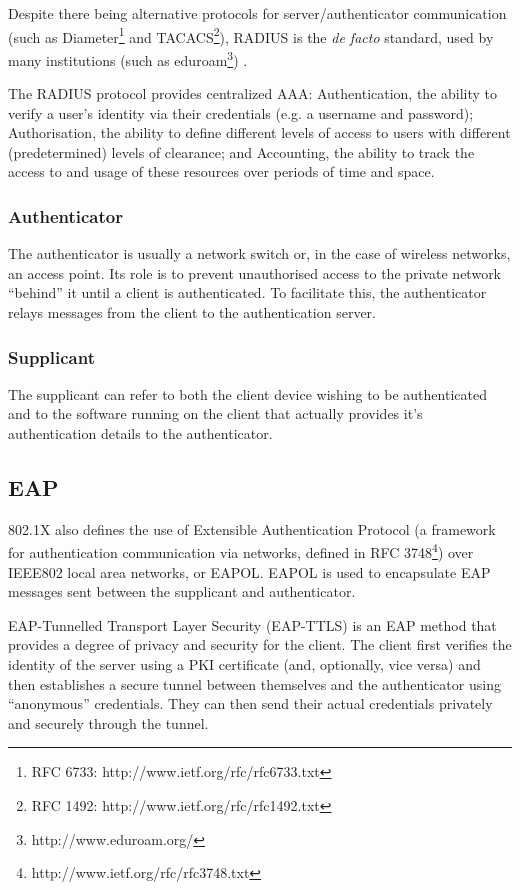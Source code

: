 \documentclass[12pt,a4paper,titlepage]{article}
\begin{document}
Despite there being alternative protocols for server/authenticator communication (such as Diameter\footnote{RFC 6733: http://www.ietf.org/rfc/rfc6733.txt} and TACACS\footnote{RFC 1492: http://www.ietf.org/rfc/rfc1492.txt}), RADIUS is the \textit{de facto} standard, used by many institutions (such as eduroam\footnote{http://www.eduroam.org/}) \cite{tipton04}.

The RADIUS protocol provides centralized AAA: Authentication, the ability to verify a user's identity via their credentials (e.g. a username and password); Authorisation, the ability to define different levels of access to users with different (predetermined) levels of clearance; and Accounting, the ability to track the access to and usage of these resources over periods of time and space.

\subsubsection{Authenticator}
The authenticator is usually a network switch or, in the case of wireless networks, an access point. Its role is to prevent unauthorised access to the private network ``behind'' it until a client is authenticated. To facilitate this, the authenticator relays messages from the client to the authentication server.

\subsubsection{Supplicant}
The supplicant can refer to both the client device wishing to be authenticated and to the software running on the client that actually provides it's authentication details to the authenticator.

\subsection{EAP}
802.1X also defines the use of Extensible Authentication Protocol (a framework for authentication communication via networks, defined in RFC 3748\footnote{http://www.ietf.org/rfc/rfc3748.txt}) over IEEE802 local area networks, or EAPOL. EAPOL is used to encapsulate EAP messages sent between the supplicant and authenticator.

EAP-Tunnelled Transport Layer Security (EAP-TTLS) is an EAP method that provides a degree of privacy and security for the client. The client first verifies the identity of the server using a PKI certificate (and, optionally, vice versa) and then establishes a secure tunnel between themselves and the authenticator using ``anonymous'' credentials. They can then send their actual credentials privately and securely through the tunnel.
\end{document}
